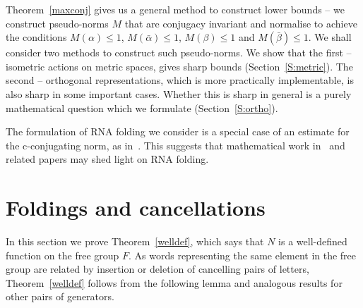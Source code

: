 \documentclass{amsart}
\theoremstyle{plain}
\theoremstyle{definition}
\theoremstyle{remark}
\renewcommand{\a}{\alpha}
\renewcommand{\b}{\beta}
\newcommand{\ba}{\bar{\alpha}}
\newcommand{\bb}{\bar{\beta}}
\begin{document}
Theorem~\ref{maxconj}  gives us a general method to construct lower bounds -- we construct  pseudo-norms $M$ that are conjugacy invariant and  normalise to achieve the conditions $M(\a)\leq 1$, $M(\ba)\leq 1$, $M(\b)\leq 1$ and $M(\bb)\leq 1$. We shall consider two methods to construct such  pseudo-norms. We show that the first -- isometric actions on metric spaces, gives sharp bounds (Section~\ref{S:metric}). The second -- orthogonal representations, which is more practically implementable, is also sharp in some important cases. Whether this is sharp in general is a purely mathematical question which we formulate (Section~\ref{S:ortho}).

The formulation of RNA folding we consider is a special case of an estimate for the c-conjugating norm, as in~\cite{GIP}. This suggests that mathematical work in~\cite{GIP} and related papers may shed light on RNA folding.

\section{Foldings and cancellations}\label{cancel}

In this section we prove Theorem~\ref{welldef}, which says that $N$ is a well-defined function on the free group $F$. As words representing the same element in the free group are related by insertion or deletion of cancelling pairs of letters, Theorem~\ref{welldef} follows from the following lemma and analogous results for other pairs of generators.
\end{document}
